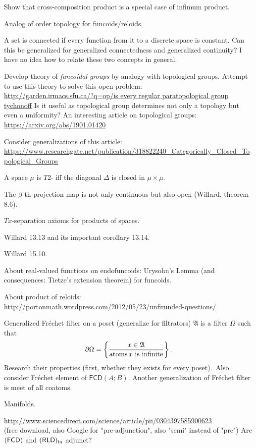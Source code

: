 \documentclass{amsart}
\begin{document}
Show that cross-composition product is a special case of infimum product.

Analog of order topology for funcoids/reloids.

A set is connected if every function from it to a discrete space is constant. Can this be generalized for generalized connectedness and generalized continuity? I have no idea how to relate these two concepts in general.

Develop theory of \emph{funcoidal groups} by analogy with topological groups.
Attempt to use this theory to solve this open problem:\\
\url{http://garden.irmacs.sfu.ca/?q=op/is every regular paratopological group tychonoff}
Is it useful as topological group determines not only a topology but even a uniformity?
An interesting article on topological groups:
\url{https://arxiv.org/abs/1901.01420}

Consider generalizations of this article: \\
\url{https://www.researchgate.net/publication/318822240_Categorically_Closed_Topological_Groups}

A space $\mu$ is $T 2$- iff the diagonal $\Delta$ is closed in $\mu\times\mu$.

The $\beta$-th projection map is not only continuous but also open (Willard, theorem 8.6).

$T x$-separation axioms for products of spaces.

Willard 13.13 and its important corollary 13.14.

Willard 15.10.

About real-valued functions on endofuncoids: Urysohn's Lemma (and consequences: Tietze's extension theorem) for funcoids.

About product of reloids:\\
\url{http://portonmath.wordpress.com/2012/05/23/unfirunded-questions/}

Generalized Fr\'echet filter on a poset (generalize for filtrators) $\mathfrak{A}$ is a filter $\Omega$ such that
\[ \partial\Omega = \left\{ \frac{x\in\mathfrak{A}}{\operatorname{atoms} x\text{ is infinite}}\right\}. \]
Research their properties (first, whether they exists for every poset).\
Also consider Fr\'echet element of $\mathsf{FCD}(A;B)$.
Another generalization of Fr\'echet filter is meet of all coatoms.

Manifolds.

\url{http://www.sciencedirect.com/science/article/pii/0304397585900623}\\
(free download, also Google for "pre-adjunction", also "semi" instead of "pre") Are $(\mathsf{FCD})$ and $(\mathsf{RLD})_{\mathrm{in}}$ adjunct?
\end{document}
